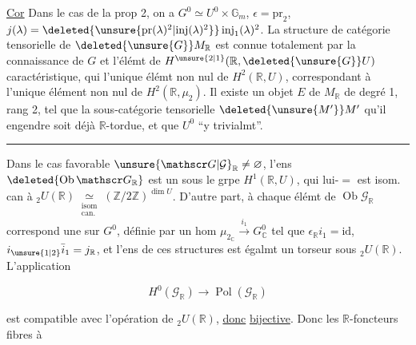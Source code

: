 



\uline{Cor} Dans le cas de la prop 2,  on a
$G^0\simeq U^0\times\mathbb G_m$, $\epsilon=\mathrm{pr}_2$, $j(\lambda)=\deleted{\unsure{\mathrm{pr}(\lambda)^2|\mathrm{inj}(\lambda)^2}}\,\mathrm{inj}_{1}(\lambda)^2$. La structure
 de catégorie tensorielle de $\deleted{\unsure{G}}M_{\mathbb R}$ est
connue totalement par la connaissance de
$G$ et l'élémt de $H^{\unsure{2|1}}(\mathbb R,\deleted{\unsure{G}}U)$ caractéristique, qui 
 l'unique élémt non nul de $H^2(\mathbb R,U)$,
correspondant à l'unique élément non nul
de $H^2(\mathbb R,\mu_2)$. Il existe un  objet $E$ de
$M_{\mathbb R}$  de degré 1, rang 2,  tel que
la sous-catégorie tensorielle $\deleted{\unsure{M'}}M'$ qu'il engendre
soit déjà $\mathbb R$-tordue, et 
 que $U^0$ ``y  trivialmt''.
\par\hspace*{.55\linewidth}\rule{2em}{.3pt}

Dans le cas favorable $\unsure{\mathscr G|\mathcal G}_{\mathbb R}\ne\varnothing$,  
l'ens $\deleted{\operatorname{Ob}\mathscr G_{\mathbb R}}$  est un
 
sous le grpe $H^{1}(\mathbb R,U)$, qui lui-$=$ est
isom. can à $ {}_2U(\mathbb R)\underset{\substack{\mathrm{isom}\\\mathrm{can.}}}{\simeq}(\mathbb Z/2\mathbb Z)^{\dim U}$. D'autre
part, à chaque élémt de $\operatorname{Ob}\mathscr G_{\mathbb R}$ correspond
une   sur $G^0$,
définie par un hom $\mu_{2_{\mathbb C}}\mathrel{\mathop{\longrightarrow}\limits^{i_1}}G^0_{\mathbb C}$ tel que
$\epsilon_{\mathbb R}i_1=\mathrm{id}$, $i_{\unsure{1|2}}\bar i_1=j_{\mathbb R}$, et l'ens de ces structures est
égalmt un torseur sous $ {}_2U(\mathbb R)$. L'application

\[
H^0(\mathscr G_{\mathbb R})\longrightarrow\operatorname{Pol}(\mathscr G_{\mathbb R})
\]

est compatible avec  l'opération de $ {}_2U(\mathbb R)$, \uline{donc}
\uline{bijective}. Donc les $\mathbb R$-foncteurs fibres à 

